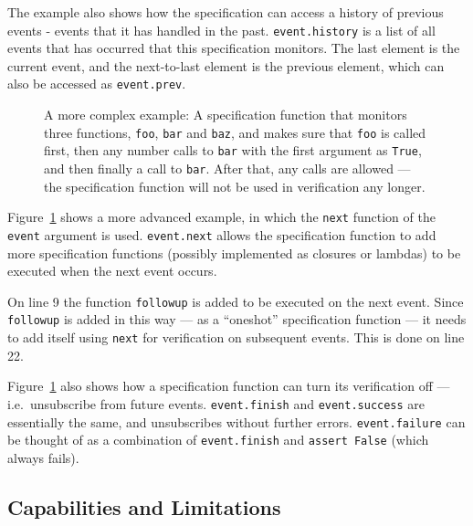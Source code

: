 \documentclass[a4paper,11pt]{kth-mag}
\begin{document}
The example also shows how the specification can access a history of previous
events - events that it has handled in the past. \texttt{event.history} is a
list of all events that has occurred that this specification monitors. The last
element is the current event, and the next-to-last element is the previous
element, which can also be accessed as \texttt{event.prev}.

\begin{figure}[h!]
	\begin{center}
	\begin{minipage}{0.7\textwidth}
	
	\end{minipage}
	\end{center}

	\caption{A more complex example: A specification function that monitors three
		functions, \texttt{foo}, \texttt{bar} and \texttt{baz}, and makes sure that
		\texttt{foo} is called first, then any number calls to \texttt{bar} with
		the first argument as \texttt{True}, and then finally a call to
	\texttt{bar}. After that, any calls are allowed --- the specification function
will not be used in verification any longer.}
	\label{figure-syntax-example-3}
\end{figure}

Figure~\ref{figure-syntax-example-3} shows a more advanced example, in which
the \texttt{next} function of the \texttt{event} argument is used.
\texttt{event.next} allows the specification function to add more specification
functions (possibly implemented as closures or lambdas) to be executed when the
next event occurs.

On line 9 the function \texttt{followup} is added to be executed on the next
event. Since \texttt{followup} is added in this way --- as a ``oneshot''
specification function --- it needs to add itself using \texttt{next} for
verification on subsequent events. This is done on line 22.

Figure~\ref{figure-syntax-example-3} also shows how a specification function
can turn its verification off --- i.e.\ unsubscribe from future events.
\texttt{event.finish} and \texttt{event.success} are essentially the same, and
unsubscribes without further errors. \texttt{event.failure} can be thought of
as a combination of \texttt{event.finish} and \texttt{assert False} (which
always fails).


\subsection{Capabilities and Limitations}
\end{document}
